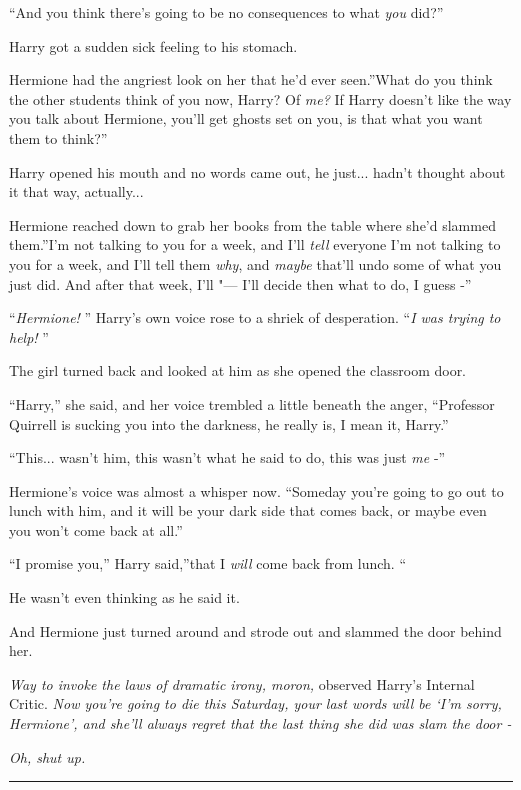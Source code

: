 ``And you think there's going to be no consequences to what \emph{you}
did?''

Harry got a sudden sick feeling to his stomach.

Hermione had the angriest look on her that he'd ever seen.''What do you
think the other students think of you now, Harry? Of \emph{me?} If Harry
doesn't like the way you talk about Hermione, you'll get ghosts set on
you, is that what you want them to think?''

Harry opened his mouth and no words came out, he just... hadn't
thought about it that way, actually...

Hermione reached down to grab her books from the table where she'd
slammed them.''I'm not talking to you for a week, and I'll \emph{tell}
everyone I'm not talking to you for a week, and I'll tell them
\emph{why}, and \emph{maybe} that'll undo some of what you just did. And
after that week, I'll "--- I'll decide then what to do, I guess -''

``\emph{Hermione!} '' Harry's own voice rose to a shriek of desperation.
``\emph{I was trying to help!} ''

The girl turned back and looked at him as she opened the classroom door.

``Harry,'' she said, and her voice trembled a little beneath the anger,
``Professor Quirrell is sucking you into the darkness, he really is, I
mean it, Harry.''

``This... wasn't him, this wasn't what he said to do, this was just
\emph{me} -''

Hermione's voice was almost a whisper now. ``Someday you're going to go
out to lunch with him, and it will be your dark side that comes back, or
maybe even you won't come back at all.''

``I promise you,'' Harry said,''that I \emph{will} come back from lunch.
``

He wasn't even thinking as he said it.

And Hermione just turned around and strode out and slammed the door
behind her.

\emph{Way to invoke the laws of dramatic irony, moron,} observed Harry's
Internal Critic. \emph{Now you're going to die this Saturday, your last
words will be `I'm sorry, Hermione', and she'll always regret that the
last thing she did was slam the door -}

\emph{Oh, shut up.}

\begin{center}\rule{3in}{0.4pt}\end{center}

